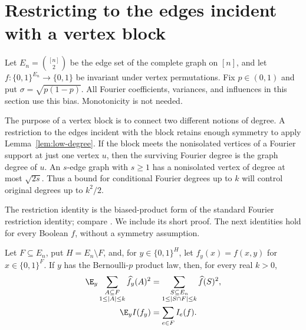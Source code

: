 \section{Restricting to the edges incident with a vertex block}
\label{sec:graph}

Let $E_n=\binom{[n]}2$ be the edge set of the complete graph on $[n]$,
and let $f\colon\{0,1\}^{E_n}\to\{0,1\}$ be invariant under vertex
permutations.  Fix $p\in(0,1)$ and put $\sigma=\sqrt{p(1-p)}$.
All Fourier coefficients, variances, and influences in this section
use this bias.  Monotonicity is not needed.

The purpose of a vertex block is to connect two different notions of
degree.  A restriction to the edges incident with the block retains
enough symmetry to apply Lemma~\ref{lem:low-degree}.  If the block meets
the nonisolated vertices of a Fourier support at just one vertex $u$,
then the surviving Fourier degree is the graph degree of $u$.
An $s$-edge graph with $s\ge1$ has a nonisolated vertex of degree at most
$\sqrt{2s}$.  Thus a bound for conditional Fourier degrees up to $k$
will control original degrees up to $k^2/2$.

The restriction identity is the biased-product form of the standard
Fourier restriction identity; compare
\cite[arXiv version~2, Lemma~2.7]{KKLMS20}.
We include its short proof. The next identities hold for every Boolean
$f$, without a symmetry assumption.

\begin{lemma}
\label{lem:restriction}
Let $F\subseteq E_n$, put $H=E_n\setminus F$, and, for
$y\in\{0,1\}^{H}$, let $f_y(x)=f(x,y)$ for
$x\in\{0,1\}^{F}$.  If $y$ has the Bernoulli-$p$ product law, then,
for every real $k>0$,
\begin{align}
 \E_y\sum_{\substack{A\subseteq F\\1\le |A|\le k}}
        \widehat{f_y}(A)^2
 &=\sum_{\substack{S\subseteq E_n\\1\le|S\cap F|\le k}}
        \widehat f(S)^2,
 \label{eq:restriction-mass}\\
 \E_y I(f_y)&=\sum_{e\in F}I_e(f).
 \label{eq:restriction-influence}
\end{align}
\end{lemma}

